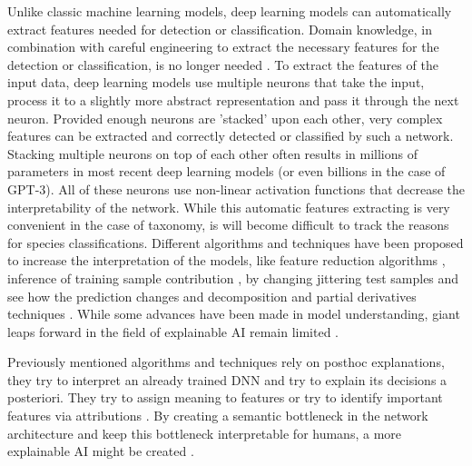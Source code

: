 \documentclass{article}
\begin{document}
Unlike classic machine learning models, deep learning models can automatically extract features needed for detection or classification.
Domain knowledge, in combination with careful engineering to extract the necessary features for the detection or classification, is no longer needed \autocite{lecun_deep_2015}.
To extract the features of the input data, deep learning models use multiple neurons that take the input, process it to a slightly more abstract representation and pass it through the next neuron.
Provided enough neurons are 'stacked' upon each other, very complex features can be extracted and correctly detected or classified by such a network.
Stacking multiple neurons on top of each other often results in millions of parameters in most recent deep learning models (or even billions in the case of GPT-3).
All of these neurons use non-linear activation functions that decrease the interpretability of the network.
While this automatic features extracting is very convenient in the case of taxonomy, is will become difficult to track the reasons for species classifications.
Different algorithms and techniques have been proposed to increase the interpretation of the models, like feature reduction algorithms \autocite{ribeiro_why_2016}, inference of training sample contribution \autocite{koh_understanding_2020}, by changing jittering test samples and see how the prediction changes \autocite{li_understanding_2017} and decomposition and partial derivatives techniques \autocite{samek_explainable_2017}.
While some advances have been made in model understanding, giant leaps forward in the field of explainable AI remain limited \autocite{lipton_mythos_2017, li_interpretable_2021}.

Previously mentioned algorithms and techniques rely on posthoc explanations, they try to interpret an already trained DNN and try to explain its decisions a posteriori.
They try to assign meaning to features \autocite{fleet_visualizing_2014} or try to identify important features via attributions \autocite{zintgraf_visualizing_2017, selvaraju_grad-cam_2017}.
By creating a semantic bottleneck in the network architecture and keep this bottleneck interpretable for humans, a more explainable AI might be created \autocite{ishikawa_contextual_2021, losch_interpretability_2019}.




\printbibliography
\end{document}
